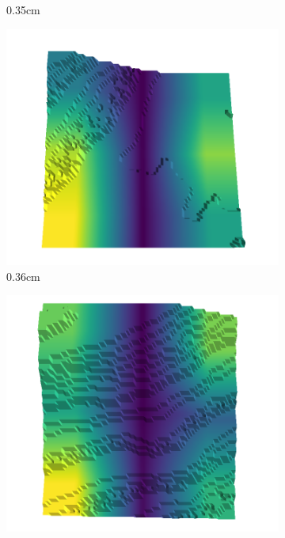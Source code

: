 \documentclass[../document.tex]{subfiles}
\begin{document}
\begin{figure}[H]
\begin{subfigure}[b]{0.242\linewidth}
    \caption{0.35cm}
    \end{subfigure}
    \begin{subfigure}[b]{0.242\linewidth}
    \includegraphics[width=\linewidth]{../img/5/quarry/best/54-patch-3d-majavi-colormap-50.png}
    \caption{0.36cm}
    \end{subfigure}
    \begin{subfigure}[b]{0.242\linewidth}
    \includegraphics[width=\linewidth]{../img/5/quarry/best/56-patch-3d-majavi-colormap-55.png}

\end{subfigure}
\end{figure}
\end{document}
